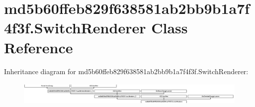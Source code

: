\hypertarget{classmd5b60ffeb829f638581ab2bb9b1a7f4f3f_1_1SwitchRenderer}{}\section{md5b60ffeb829f638581ab2bb9b1a7f4f3f.\+Switch\+Renderer Class Reference}
\label{classmd5b60ffeb829f638581ab2bb9b1a7f4f3f_1_1SwitchRenderer}
Inheritance diagram for md5b60ffeb829f638581ab2bb9b1a7f4f3f.\+Switch\+Renderer\+:\begin{figure}[H]
\begin{center}
\leavevmode
\includegraphics[height=1.122807cm]{classmd5b60ffeb829f638581ab2bb9b1a7f4f3f_1_1SwitchRenderer}
\end{center}
\end{figure}
